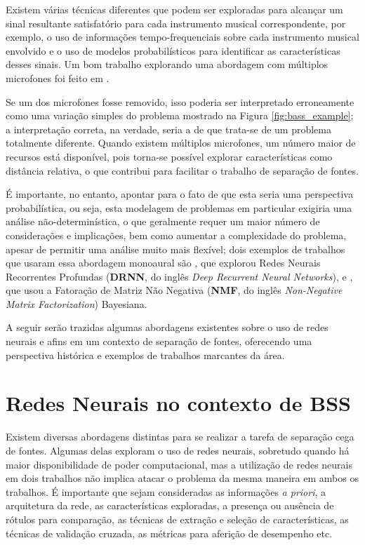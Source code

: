 Existem várias técnicas diferentes que podem ser exploradas para alcançar um sinal resultante satisfatório para cada instrumento musical correspondente, por exemplo, o uso de informações tempo-frequenciais sobre cada instrumento musical envolvido e o uso de modelos probabilísticos para identificar as características desses sinais. Um bom trabalho explorando uma abordagem com múltiplos microfones foi feito em \citep{7805139}.

Se um dos microfones fosse removido, isso poderia ser interpretado erroneamente como uma variação simples do problema mostrado na Figura \ref{fig:bass_example}; a interpretação correta, na verdade, seria a de que trata-se de um problema totalmente diferente. Quando existem múltiplos microfones, um número maior de recursos está disponível, pois torna-se possível explorar características como distância relativa, o que contribui para facilitar o trabalho de separação de fontes.

É importante, no entanto, apontar para o fato de que esta seria uma perspectiva probabilística, ou seja, esta modelagem de problemas em particular exigiria uma análise não-determinística, o que geralmente requer um maior número de considerações e implicações, bem como aumentar a complexidade do problema, apesar de permitir uma análise muito mais flexível; dois exemplos de trabalhos que usaram essa abordagem monoaural são \citep{7194774}, que explorou Redes Neurais Recorrentes Profundas (\textbf{DRNN}, do inglês \textit{Deep Recurrent Neural Networks}), e \citep{7331633}, que usou a Fatoração de Matriz Não Negativa (\textbf{NMF}, do inglês \textit{Non-Negative Matrix Factorization}) Bayesiana.


A seguir serão trazidas algumas abordagens existentes sobre o uso de redes neurais e afins em um contexto de separação de fontes, oferecendo uma perspectiva histórica e exemplos de trabalhos marcantes da área.


\section{Redes Neurais no contexto de BSS}
\label{sec:intro_ann_for_bss}

Existem diversas abordagens distintas para se realizar a tarefa de separação cega de fontes. Algumas delas exploram o uso de redes neurais, sobretudo quando há maior disponibilidade de poder computacional, mas a utilização de redes neurais em dois trabalhos não implica atacar o problema da mesma maneira em ambos os trabalhos. É importante que sejam consideradas as informações \textit{a priori}, a arquitetura da rede, as características exploradas, a presença ou ausência de rótulos para comparação, as técnicas de extração e seleção de características, as técnicas de validação cruzada, as métricas para aferição de desempenho etc.

